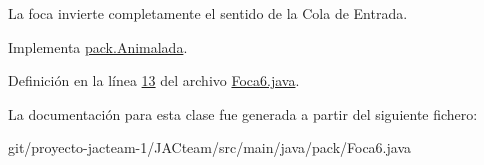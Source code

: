 La foca invierte completamente el sentido de la Cola de Entrada. 

Implementa \mbox{\hyperlink{interfacepack_1_1_animalada_a5ba346bdbccde39f3ea438ae8cbf8c1b}{pack.\+Animalada}}.



Definición en la línea \mbox{\hyperlink{_foca6_8java_source_l00013}{13}} del archivo \mbox{\hyperlink{_foca6_8java_source}{Foca6.\+java}}.



La documentación para esta clase fue generada a partir del siguiente fichero\+:\begin{DoxyCompactItemize}
\item 
git/proyecto-\/jacteam-\/1/\+J\+A\+Cteam/src/main/java/pack/Foca6.\+java\end{DoxyCompactItemize}
